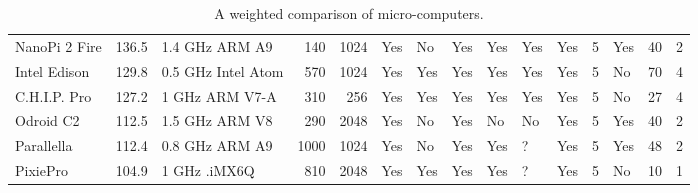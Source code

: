 \begin{table}
\begin{tabular}{lrlrrllllllrlrr}
    \rowcolor[rgb]{ .851,  .851,  .851} NanoPi 2 Fire & \cellcolor[rgb]{ .996,  .851,  .502}136.5 & 1.4 GHz ARM A9 & 140   & 1024  & \cellcolor[rgb]{ .573,  .816,  .314}Yes & No    & \cellcolor[rgb]{ .573,  .816,  .314}Yes & \cellcolor[rgb]{ .573,  .816,  .314}Yes & \cellcolor[rgb]{ .573,  .816,  .314}Yes & \cellcolor[rgb]{ .573,  .816,  .314}Yes & 5     & \cellcolor[rgb]{ .573,  .816,  .314}Yes & 40    & 2 \\
    Intel Edison & \cellcolor[rgb]{ .988,  .757,  .486}129.8 & 0.5 GHz Intel Atom & 570   & 1024  & \cellcolor[rgb]{ .573,  .816,  .314}Yes & \cellcolor[rgb]{ .573,  .816,  .314}Yes & \cellcolor[rgb]{ .573,  .816,  .314}Yes & \cellcolor[rgb]{ .573,  .816,  .314}Yes & \cellcolor[rgb]{ .573,  .816,  .314}Yes & \cellcolor[rgb]{ .573,  .816,  .314}Yes & 5     & No    & 70    & 4 \\
    \rowcolor[rgb]{ .851,  .851,  .851} C.H.I.P. Pro & \cellcolor[rgb]{ .988,  .722,  .478}127.2 & 1 GHz ARM V7-A & 310   & 256   & \cellcolor[rgb]{ .573,  .816,  .314}Yes & \cellcolor[rgb]{ .573,  .816,  .314}Yes & \cellcolor[rgb]{ .573,  .816,  .314}Yes & \cellcolor[rgb]{ .573,  .816,  .314}Yes & \cellcolor[rgb]{ .573,  .816,  .314}Yes & \cellcolor[rgb]{ .573,  .816,  .314}Yes & 5     & No    & 27    & 4 \\
    Odroid C2 & \cellcolor[rgb]{ .976,  .518,  .439}112.5 & 1.5 GHz ARM V8 & 290   & 2048  & \cellcolor[rgb]{ .573,  .816,  .314}Yes & No    & \cellcolor[rgb]{ .573,  .816,  .314}Yes & No    & No    & \cellcolor[rgb]{ .573,  .816,  .314}Yes & 5     & \cellcolor[rgb]{ .573,  .816,  .314}Yes & 40    & 2 \\
    \rowcolor[rgb]{ .851,  .851,  .851} Parallella & \cellcolor[rgb]{ .976,  .514,  .439}112.4 & 0.8 GHz ARM A9 & 1000  & 1024  & \cellcolor[rgb]{ .573,  .816,  .314}Yes & No    & \cellcolor[rgb]{ .573,  .816,  .314}Yes & \cellcolor[rgb]{ .573,  .816,  .314}Yes & ?     & \cellcolor[rgb]{ .573,  .816,  .314}Yes & 5     & \cellcolor[rgb]{ .573,  .816,  .314}Yes & 48    & 2 \\
    PixiePro & \cellcolor[rgb]{ .973,  .412,  .42}104.9 & 1 GHz .iMX6Q  & 810   & 2048  & \cellcolor[rgb]{ .573,  .816,  .314}Yes & \cellcolor[rgb]{ .573,  .816,  .314}Yes & \cellcolor[rgb]{ .573,  .816,  .314}Yes & \cellcolor[rgb]{ .573,  .816,  .314}Yes & ?     & \cellcolor[rgb]{ .573,  .816,  .314}Yes & 5     & No    & 10    & 1 \\
    \bottomrule
    \end{tabular}%
  \caption{A weighted comparison of micro-computers.}
  \label{tab:board_candidates}%
\end{table}%


